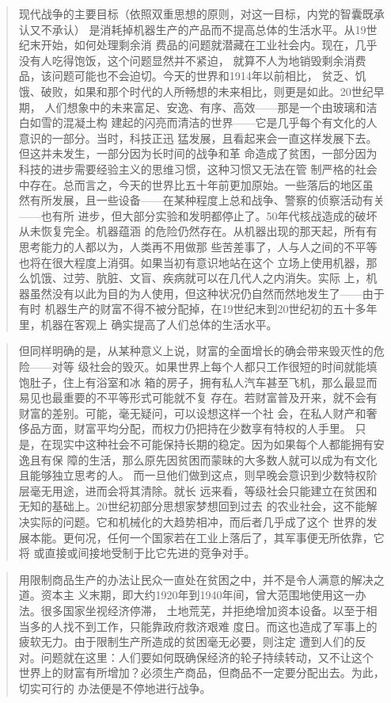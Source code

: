 \begin{quotation}
现代战争的主要目标（依照双重思想的原则，对这一目标，内党的智囊既承认又不承认）
是消耗掉机器生产的产品而不提高总体的生活水平。从19世纪末开始，如何处理剩余消
费品的问题就潜藏在工业社会内。现在，几乎没有人吃得饱饭，这个问题显然并不紧迫，
就算不人为地销毁剩余消费品，该问题可能也不会迫切。今天的世界和1914年以前相比，
贫乏、饥饿、破败，如果和那个时代的人所畅想的未来相比，则更是如此。20世纪早期，
人们想象中的未来富足、安逸、有序、高效——那是一个由玻璃和洁白如雪的混凝土构
建起的闪亮而清洁的世界——它是几乎每个有文化的人意识的一部分。当时，科技正迅
猛发展，且看起来会一直这样发展下去。但这并未发生，一部分因为长时间的战争和革
命造成了贫困，一部分因为科技的进步需要经验主义的思维习惯，这种习惯又无法在管
制严格的社会中存在。总而言之，今天的世界比五十年前更加原始。一些落后的地区虽
然有所发展，且一些设备——在某种程度上总和战争、警察的侦察活动有关——也有所
进步，但大部分实验和发明都停止了。50年代核战造成的破坏从未恢复完全。机器蕴涵
的危险仍然存在。从机器出现的那天起，所有有思考能力的人都以为，人类再不用做那
些苦差事了，人与人之间的不平等也将在很大程度上消弭。如果当初有意识地站在这个
立场上使用机器，那么饥饿、过劳、肮脏、文盲、疾病就可以在几代人之内消失。实际
上，机器虽然没有以此为目的为人使用，但这种状况仍自然而然地发生了——由于有时
机器生产的财富不得不被分配掉，在19世纪末到20世纪初的五十多年里，机器在客观上
确实提高了人们总体的生活水平。
\end{quotation}

\begin{quotation}
但同样明确的是，从某种意义上说，财富的全面增长的确会带来毁灭性的危险——对等
级社会的毁灭。如果世界上每个人都只工作很短的时间就能填饱肚子，住上有浴室和冰
箱的房子，拥有私人汽车甚至飞机，那么最显而易见也最重要的不平等形式可能就不复
存在。若财富普及开来，就不会有财富的差别。可能，毫无疑问，可以设想这样一个社
会，在私人财产和奢侈品方面，财富平均分配，而权力仍把持在少数享有特权的人手里。
只是，在现实中这种社会不可能保持长期的稳定。因为如果每个人都能拥有安逸且有保
障的生活，那么原先因贫困而蒙昧的大多数人就可以成为有文化且能够独立思考的人。
而一旦他们做到这点，则早晚会意识到少数特权阶层毫无用途，进而会将其清除。就长
远来看，等级社会只能建立在贫困和无知的基础上。20世纪初部分思想家梦想回到过去
的农业社会，这不能解决实际的问题。它和机械化的大趋势相冲，而后者几乎成了这个
世界的发展本能。更何况，任何一个国家若在工业上落后了，其军事便无所依靠，它将
或直接或间接地受制于比它先进的竞争对手。
\end{quotation}

\begin{quotation}
用限制商品生产的办法让民众一直处在贫困之中，并不是令人满意的解决之道。资本主
义末期，即大约1920年到1940年间，曾大范围地使用这一办法。很多国家坐视经济停滞，
土地荒芜，并拒绝增加资本设备。以至于相当多的人找不到工作，只能靠政府救济艰难
度日。而这也造成了军事上的疲软无力。由于限制生产所造成的贫困毫无必要，则注定
遭到人们的反对。问题就在这里：人们要如何既确保经济的轮子持续转动，又不让这个
世界上的财富有所增加？必须生产商品，但商品不一定要分配出去。为此，切实可行的
办法便是不停地进行战争。
\end{quotation}

